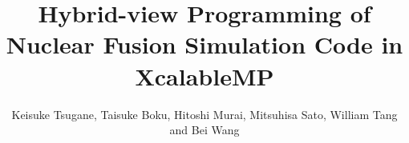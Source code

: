 \documentclass[graybox]{svmult}
\begin{document}
\title*{
  Hybrid-view Programming of Nuclear Fusion Simulation Code in XcalableMP
}
\author{
  Keisuke Tsugane, Taisuke Boku, Hitoshi Murai,
  Mitsuhisa Sato, William Tang and Bei Wang
}

%
%
\maketitle




\end{document}

